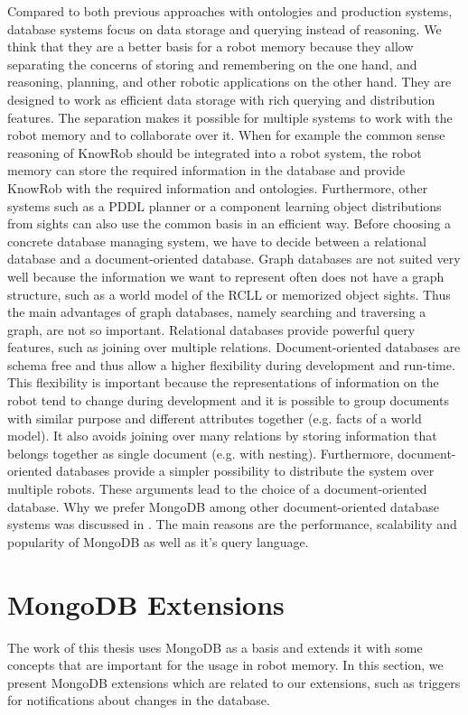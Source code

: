 Compared to both previous approaches with ontologies and production
systems, database systems focus on data storage and querying instead
of reasoning. We think that they are a better basis for a robot memory
because they allow separating the concerns of storing and remembering
on the one hand, and reasoning, planning, and other robotic
applications on the other hand. They are designed to work as efficient
data storage with rich querying and distribution features. The
separation makes it possible for multiple systems to work with the
robot memory and to collaborate over it. When for example the common
sense reasoning of KnowRob should be integrated into a robot system,
the robot memory can store the required information in the database
and provide KnowRob with the required information and
ontologies. Furthermore, other systems such as a PDDL planner or a
component learning object distributions from sights can also use the
common basis in an efficient way. Before choosing a concrete database
managing system, we have to decide between a relational database and a
document-oriented database. Graph databases are not suited very well
because the information we want to represent often does not have a
graph structure, such as a world model of the RCLL or memorized object
sights. Thus the main advantages of graph databases, namely searching
and traversing a graph, are not so important. Relational databases provide powerful query features,
such as joining over multiple relations. Document-oriented databases
are schema free and thus allow a higher flexibility during development
and run-time. This flexibility is important because the representations of
information on the robot tend to change during development and it is
possible to group documents with similar purpose and different
attributes together (e.g. facts of a world model). It also avoids
joining over many relations by storing information that
belongs together as single document (e.g. with nesting).  Furthermore,
document-oriented databases provide a simpler possibility to
distribute the system over multiple robots. These arguments lead to
the choice of a document-oriented database. Why we prefer MongoDB
among other document-oriented database systems was discussed in
. The main reasons are the performance,
scalability and popularity of MongoDB as well as it's query language.

\section{MongoDB Extensions}
\label{sec:mongodb-extensions}
The work of this thesis uses MongoDB as a basis and extends it with
some concepts that are important for the usage in robot memory. In
this section, we present MongoDB extensions which are related to our
extensions, such as triggers for notifications about changes
in the database.

